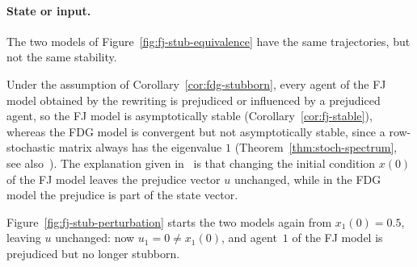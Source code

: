 \paragraph{State or input.}
The two models of Figure~\ref{fig:fj-stub-equivalence} have the same trajectories, but
not the same stability.
% 

Under the assumption of Corollary~\ref{cor:fdg-stubborn}, every agent of the FJ model
obtained by the rewriting is prejudiced or influenced by a prejudiced agent, so the FJ
model is asymptotically stable (Corollary~\ref{cor:fj-stable}), whereas the FDG model
is convergent but not asymptotically stable, since a row-stochastic matrix always has
the eigenvalue $1$ (Theorem~\ref{thm:stoch-spectrum}, see
also~\cite{proskurnikov2017tutorial}). The explanation given
in~\cite{proskurnikov2017tutorial} is that changing the initial condition $x(0)$ of the
FJ model leaves the prejudice vector $u$ unchanged, while in the FDG model the prejudice
is part of the state vector.

Figure~\ref{fig:fj-stub-perturbation} starts the two models again from $x_1(0) = 0.5$,
leaving $u$ unchanged: now $u_1 = 0 \neq x_1(0)$, and agent~$1$ of the FJ model is
prejudiced but no longer stubborn.

